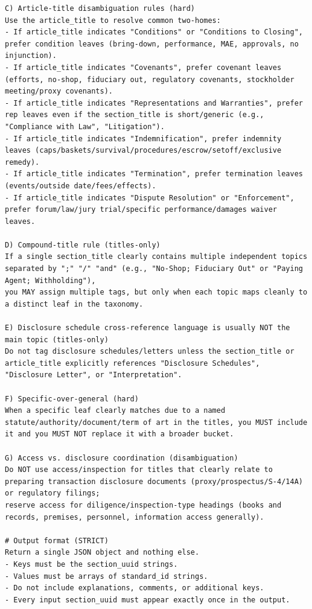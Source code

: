 \documentclass[12pt]{article}
\begin{document}
{\begin{appendices}
\begin{verbatim}
C) Article-title disambiguation rules (hard)
Use the article_title to resolve common two-homes:
- If article_title indicates "Conditions" or "Conditions to Closing", prefer condition leaves (bring-down, performance, MAE, approvals, no injunction).
- If article_title indicates "Covenants", prefer covenant leaves (efforts, no-shop, fiduciary out, regulatory covenants, stockholder meeting/proxy covenants).
- If article_title indicates "Representations and Warranties", prefer rep leaves even if the section_title is short/generic (e.g., "Compliance with Law", "Litigation").
- If article_title indicates "Indemnification", prefer indemnity leaves (caps/baskets/survival/procedures/escrow/setoff/exclusive remedy).
- If article_title indicates "Termination", prefer termination leaves (events/outside date/fees/effects).
- If article_title indicates "Dispute Resolution" or "Enforcement", prefer forum/law/jury trial/specific performance/damages waiver leaves.

D) Compound-title rule (titles-only)
If a single section_title clearly contains multiple independent topics separated by ";" "/" "and" (e.g., "No-Shop; Fiduciary Out" or "Paying Agent; Withholding"),
you MAY assign multiple tags, but only when each topic maps cleanly to a distinct leaf in the taxonomy.

E) Disclosure schedule cross-reference language is usually NOT the main topic (titles-only)
Do not tag disclosure schedules/letters unless the section_title or article_title explicitly references "Disclosure Schedules", "Disclosure Letter", or "Interpretation".

F) Specific-over-general (hard)
When a specific leaf clearly matches due to a named statute/authority/document/term of art in the titles, you MUST include it and you MUST NOT replace it with a broader bucket.

G) Access vs. disclosure coordination (disambiguation)
Do NOT use access/inspection for titles that clearly relate to preparing transaction disclosure documents (proxy/prospectus/S-4/14A) or regulatory filings;
reserve access for diligence/inspection-type headings (books and records, premises, personnel, information access generally).

# Output format (STRICT)
Return a single JSON object and nothing else.
- Keys must be the section_uuid strings.
- Values must be arrays of standard_id strings.
- Do not include explanations, comments, or additional keys.
- Every input section_uuid must appear exactly once in the output.
\end{verbatim}
\endgroup


\end{appendices}}
\end{document}

